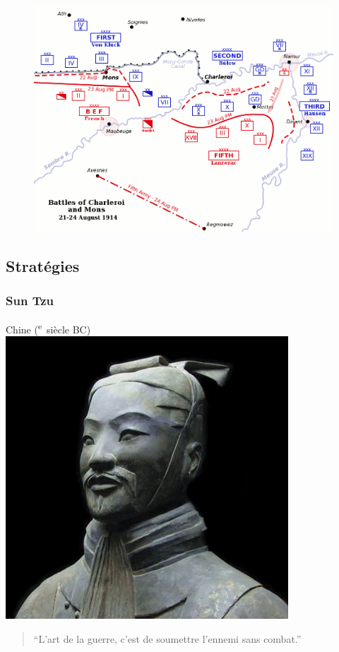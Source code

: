 \documentclass{article}
\newcommand{\cRM}[1]{\MakeUppercase{\romannumeral #1}}  %
\newcommand{\siecle}[1]{\cRM{#1}\textsuperscript{e}~siècle}
\begin{document}
\begin{figure}[H]
	\begin{centering}
	\includegraphics[width=\linewidth]{../ressources/Battles_of_Charleroi_ww1}
	\caption{\cite{tactic}}
	\end{centering}
\end{figure}



\subsection{Stratégies}

\subsubsection{Sun Tzu}
Chine (\siecle{6} BC)
\includegraphics[]{../ressources/sun_tzu_general}
\begin{quote}“L'art de la guerre, c'est de soumettre l'ennemi sans combat.”\end{quote}
\end{document}
